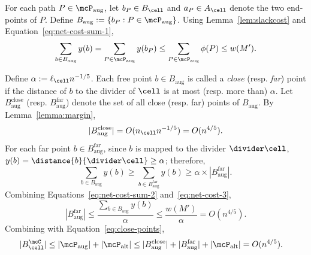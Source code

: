 For each path $P\in \mcP_{\mathrm{aug}}$, let $b_P\in B_\cell$ and $a_P\in A_\cell$ denote the two end-points of $P$. Define $B_{\mathrm{aug}}:=\{b_P:P\in \mcP_{\mathrm{aug}}\}$.  Using Lemma~\ref{lem:slackcost} and Equation~\eqref{eq:net-cost-sum-1}, 
\begin{align}
    \sum_{b\in B_{\mathrm{aug}}} y(b) = \sum_{P\in \mcP_{\mathrm{aug}}} y(b_P)\le \sum_{P\in \mcP_{\mathrm{aug}}} \phi(P) \le w(M') .\label{eq:net-cost-sum-2}
\end{align}

Define $\alpha:=\ell_\cell n^{-1/5}$. Each free point $b\in B_{\mathrm{aug}}$ is called a \emph{close} (resp. \emph{far}) point if the distance of $b$ to the divider of $\cell$ is at most (resp. more than) $\alpha$. Let $B_{\mathrm{aug}}^{\mathrm{close}}$ (resp. $B_{\mathrm{aug}}^{\mathrm{far}}$) denote the set of all close (resp. far) points of $B_{\mathrm{aug}}$. By Lemma~\ref{lemma:margin},
\begin{equation}\label{eq:close-points}
    |B_{\mathrm{aug}}^{\mathrm{close}}| = O(n_\cell n^{-1/5}) = O(n^{4/5}).
\end{equation}
For each far point $b\in B_{\mathrm{aug}}^{\mathrm{far}}$, since $b$ is mapped to the divider $\divider\cell$, $y(b)=\distance{b}{\divider\cell}\ge \alpha$; therefore, 
\begin{equation}\label{eq:net-cost-3}
    \sum_{b\in B_{\mathrm{aug}}} y(b) \ge \sum_{b\in B_{\mathrm{aug}}^{\mathrm{far}}} y(b) \ge \alpha\times |B_{\mathrm{aug}}^{\mathrm{far}}|.
\end{equation}
Combining Equations~\eqref{eq:net-cost-sum-2} and~\eqref{eq:net-cost-3},
\begin{equation}\label{eq:far-points}
    |B_{\mathrm{aug}}^{\mathrm{far}}| \le \frac{\sum_{b\in B_{\mathrm{aug}}} y(b)}{\alpha} \le \frac{w(M')}{\alpha} = O(n^{4/5}).
\end{equation}
Combining with Equation~\eqref{eq:close-points},
\begin{align*}
    |B_\cell^\mcC| &\le |\mcP_{\mathrm{aug}}| + |\mcP_{\mathrm{alt}}| \le |B_{\mathrm{aug}}^{\mathrm{close}}| + |B_{\mathrm{aug}}^{\mathrm{far}}| + |\mcP_{\mathrm{alt}}| = O(n^{4/5}).
\end{align*}



%

%
%
%

%



%

%
%
%
%
%
%
%
%
%

